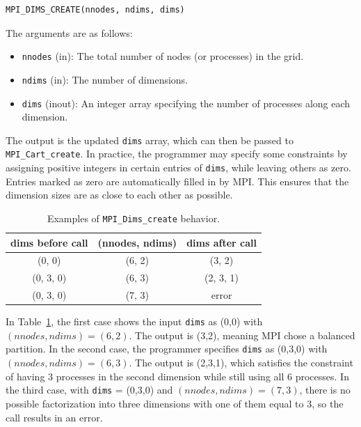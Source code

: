 \documentclass[12pt]{book}
\begin{document}
\begin{lstlisting}[style=cppstyle]
MPI_DIMS_CREATE(nnodes, ndims, dims)
\end{lstlisting}

The arguments are as follows:
\begin{itemize}
    \item \texttt{nnodes} (in): The total number of nodes (or processes) in the grid.
    \item \texttt{ndims} (in): The number of dimensions.
    \item \texttt{dims} (inout): An integer array specifying the number of processes along each dimension.
\end{itemize}

\noindent
The output is the updated \texttt{dims} array, which can then be passed to \texttt{MPI\_Cart\_create}.  
In practice, the programmer may specify some constraints by assigning positive integers in certain entries of \texttt{dims}, while leaving others as zero. Entries marked as zero are automatically filled in by MPI. This ensures that the dimension sizes are as close to each other as possible.

\begin{table}[H]
    \centering
    \begin{tabular}{ccc}
        \hline
        dims before call & (nnodes, ndims) & dims after call \\
        \hline
        (0, 0) & (6, 2) & (3, 2) \\
        (0, 3, 0) & (6, 3) & (2, 3, 1) \\
        (0, 3, 0) & (7, 3) & error \\
        \hline
    \end{tabular}
    \caption{Examples of \texttt{MPI\_Dims\_create} behavior.}
    \label{tab:example_cart}
\end{table}

\noindent
In Table~\ref{tab:example_cart}, the first case shows the input \texttt{dims} as (0,0) with $(nnodes, ndims) = (6,2)$. The output is (3,2), meaning MPI chose a balanced partition.  
In the second case, the programmer specifies \texttt{dims} as (0,3,0) with $(nnodes, ndims) = (6,3)$. The output is (2,3,1), which satisfies the constraint of having 3 processes in the second dimension while still using all 6 processes.  
In the third case, with \texttt{dims} = (0,3,0) and $(nnodes, ndims) = (7,3)$, there is no possible factorization into three dimensions with one of them equal to 3, so the call results in an error.
\end{document}
